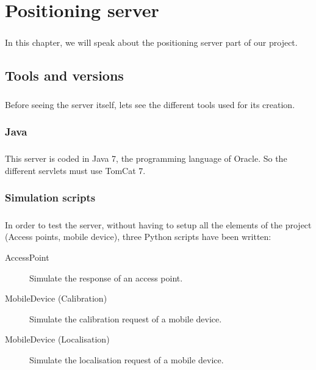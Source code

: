 \chapter{Positioning server}

\paragraph{}
In this chapter, we will speak about the positioning server part of our project. 

    \section{Tools and versions}

\paragraph{}
Before seeing the server itself, lets see the different tools used for its
creation.

        \subsection{Java}

\paragraph{}
This server is coded in Java 7, the programming language of Oracle. So the
different servlets must use TomCat 7.


        \subsection{Simulation scripts}

\paragraph{}
In order to test the server, without having to setup all the elements of the
project (Access points, mobile device), three Python scripts have been written:

\begin{description}
    \item [AccessPoint] Simulate the response of an access point.
    \item [MobileDevice (Calibration)] Simulate the calibration request of a
        mobile device.
    \item [MobileDevice (Localisation)] Simulate the localisation request of a
        mobile device.
\end{description}

